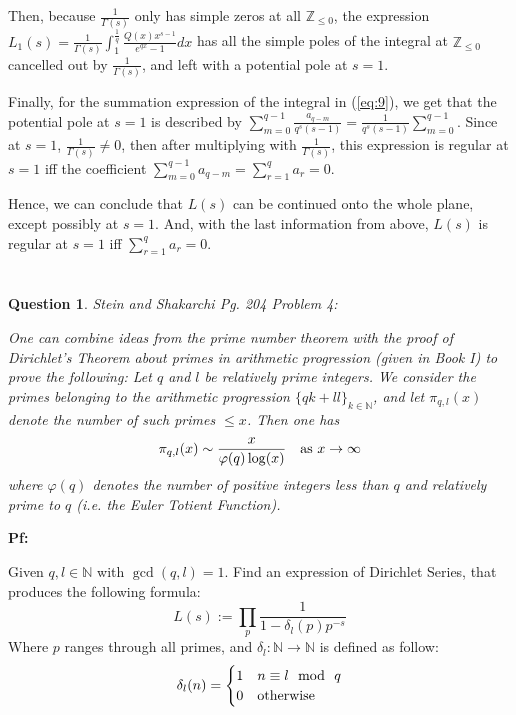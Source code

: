 \documentclass{article}
\newtheorem{question}{Question}
\newcommand{\ZZ}{\mathbb{Z}}
\begin{document}
Then, because $\frac{1}{\Gamma(s)}$ only has simple zeros at all $\ZZ_{\leq 0}$, the expression $L_1(s)= \frac{1}{\Gamma(s)}\int_{1}^{\frac{1}{q}}\frac{Q(x)x^{s-1}}{e^{qx}-1}dx$ has all the simple poles of the integral at $\ZZ_{\leq 0}$ cancelled out by $\frac{1}{\Gamma(s)}$, and left with a potential pole at $s=1$.

\hfil

Finally, for the summation expression of the integral in (\ref{eq:9}), we get that the potential pole at $s=1$ is described by $\sum_{m=0}^{q-1}\frac{a_{q-m}}{q^s(s-1)}=\frac{1}{q^s(s-1)}\sum_{m=0}^{q-1}$. Since at $s=1$, $\frac{1}{\Gamma(s)}\neq 0$, then after multiplying with $\frac{1}{\Gamma(s)}$, this expression is regular at $s=1$ iff the coefficient $\sum_{m=0}^{q-1}a_{q-m}=\sum_{r=1}^{q}a_r = 0$. 

Hence, we can conclude that $L(s)$ can be continued onto the whole plane, except possibly at $s=1$. And, with the last information from above, $L(s)$ is regular at $s=1$ iff $\sum_{r=1}^{q}a_r=0$.

\break

\section{}
\begin{question}\label{q:2}
    Stein and Shakarchi Pg. 204 Problem 4:

    One can combine ideas from the prime number theorem with the proof of Dirichlet's Theorem about primes in arithmetic progression (given in Book I) to prove the following: Let $q$ and $l$ be relatively prime integers. We consider the primes belonging to the arithmetic progression $\{qk+ll\}_{k\in\mathbb{N}}$, and let $\pi_{q,l}(x)$ denote the number of such primes $\leq x$. Then one has 
    $$\pi_{q,l}(x)\sim \frac{x}{\varphi(q)\log(x)}\quad \textmd{as }x\rightarrow\infty$$
    where $\varphi(q)$ denotes the number of positive integers less than $q$ and relatively prime to $q$ (i.e. the Euler Totient Function).
\end{question}

\textbf{Pf:}

Given $q,l\in\mathbb{N}$ with $\gcd(q,l)=1$. Find an expression of Dirichlet Series, that produces the following formula:
$$L(s):=\prod_{p}\frac{1}{1-\delta_l(p)p^{-s}}$$
Where $p$ ranges through all primes, and $\delta_l:\mathbb{N}\rightarrow\mathbb{N}$ is defined as follow:
$$\delta_l(n)=\begin{cases}
    1 & n\equiv l\mod\ q\\
    0 & \textmd{otherwise}
\end{cases}$$
\end{document}
